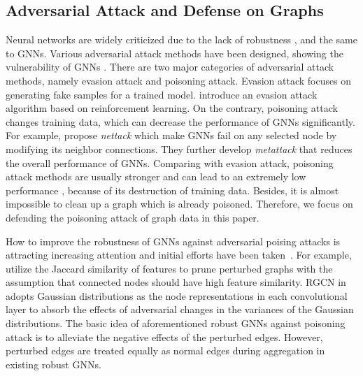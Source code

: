 \documentclass[sigconf]{acmart}
\begin{document}
\subsection{Adversarial Attack and Defense on Graphs}
Neural networks are widely criticized due to the lack of robustness \cite{goodfellow2014explaining,li2019nattack,li2018learning,cheng2018query,li2019regional,li2019click}, and the same to GNNs. Various adversarial attack methods have been designed, showing the vulnerability of GNNs \cite{dai2018adversarial,bojchevski2019adversarial,chen2018fast,zugner2019certifiable,xu2019adversarial}.
There are two major categories of adversarial attack methods, namely evasion attack and poisoning attack.
Evasion attack focuses on generating fake samples for a trained model. \citeauthor{dai2018adversarial} \cite{dai2018adversarial} introduce an evasion attack algorithm based on reinforcement learning. 
On the contrary, poisoning attack changes training data, which can decrease the performance of GNNs significantly. 
For example, \citeauthor{zugner2018adversarial} \cite{zugner2018adversarial} propose \textit{nettack} which make GNNs fail on any selected node by modifying its neighbor connections.
They further develop \textit{metattack} \cite{zugner2018adversarial2} that reduces the overall performance of GNNs. 
Comparing with evasion attack, poisoning attack methods are usually stronger and can lead to an extremely low performance \cite{zugner2018adversarial,zhu2019robust,sun2019node}, because of its destruction of training data. Besides, it is almost impossible to clean up a graph which is already poisoned. 
Therefore, we focus on defending the poisoning attack of graph data in this paper.

How to improve the robustness of GNNs against adversarial poising attacks is attracting increasing attention and initial efforts have been taken~\cite{xu2019topology,wu2019adversarial,zhu2019robust,jin2019power}.
For example, \citeauthor{wu2019adversarial} \cite{wu2019adversarial} utilize the Jaccard similarity of features to prune perturbed graphs with the assumption that connected nodes should have high feature similarity. RGCN in~\cite{zhu2019robust} adopts
Gaussian distributions as the node representations in each convolutional layer to absorb the effects of adversarial changes in the variances of the Gaussian distributions. 
The basic idea of aforementioned robust GNNs against poisoning attack is to alleviate the negative effects of the perturbed edges. However, perturbed edges are treated equally as normal edges during aggregation in existing robust GNNs.
\end{document}
